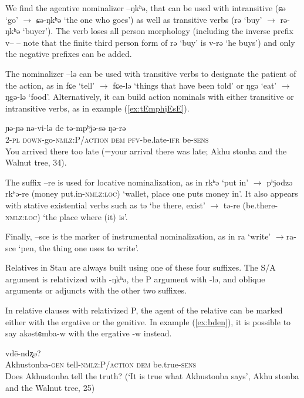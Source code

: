 \documentclass[oneside,a4paper,11pt]{article}
\newcommand{\ipa}[1]{{\phon #1}} %
\begin{document}
We find the agentive nominalizer \ipa{--ŋkʰə}, that can be used with intransitive (\ipa{ɕə}  `go' $\rightarrow$ \ipa{ɕə-ŋkʰə} `the one who goes') as well as transitive verbs (\ipa{rə} `buy' $\rightarrow$ \ipa{rə-ŋkʰə} `buyer'). The verb loses all person morphology (including the inverse prefix \ipa{v--} -- note that the finite third person form of \ipa{rə} `buy' is \ipa{v-rə} `he buys') and only the negative prefixes can be added.
 
The nominalizer \ipa{--lə} can be used with transitive verbs to designate the patient of the action, as in \ipa{fɕe} `tell' $\rightarrow$ \ipa{fɕe-lə} `things that have been told' or \ipa{ŋgə} `eat' $\rightarrow$ \ipa{ŋgə-lə} `food'. Alternatively, it can build action nominals with either transitive or intransitive verbs, as  in example (\ref{ex:tEmphjEsE}).

\begin{exe}
\ex \label{ex:tEmphjEsE} 
\gll
\ipa{ɲə-ɲə} 	\ipa{nə-vi-lə} 	\ipa{de} 	\ipa{tə-mpʰjə-sə} 	\ipa{ŋə-rə} \\
2-\textsc{pl} \textsc{down}-go-\textsc{nmlz:P/action} \textsc{dem} \textsc{pfv}-be.late-\textsc{ifr} be-\textsc{sens}\\
\glt You arrived there too late (=your arrival there was late; Akhu stonba and the Walnut tree, 34).
\end{exe}

The suffix \ipa{--re} is used for locative nominalization, as in \ipa{rkʰə} `put in' $\rightarrow$ \ipa{pʰjodzə} \ipa{rkʰə-re} (money put.in-\textsc{nmlz:loc}) `wallet, place one puts money in'. It also appears with stative existential verbs such as \ipa{tə} `be there, exist' $\rightarrow$ \ipa{tə-re} (be.there-\textsc{nmlz:loc}) `the place where (it) is'. 

Finally, \ipa{--sce} is the marker of instrumental nominalization, as in \ipa{ra} `write' $\rightarrow$\ipa{ra-sce} `pen, the thing one uses to write'.

Relatives in Stau are always built using one of these four suffixes. The S/A  argument is relativized with \ipa{-ŋkʰə}, the P argument with \ipa{-lə}, and oblique arguments or adjuncts with the other two suffixes. 

In relative clauses with relativized P, the agent of the relative can be marked either with the ergative or the genitive. In example (\ref{ex:bden}), it is possible to say  \ipa{akəstɞmba-w} with the ergative \ipa{-w} instead.

\begin{exe}
\ex \label{ex:bden}
\gll 
 [\ipa{akəstɞmba-j} 	\ipa{fɕe-lə}] 	\ipa{de} 	\ipa{vdẽ-ndʐə?} \\
 Akhustonba-\textsc{gen} tell-\textsc{nmlz:P/action} \textsc{dem} be.true-\textsc{sens} \\
\glt Does Akhustonba tell the truth?  (`It is true what Akhustonba says', Akhu stonba and the Walnut tree, 25)
\end{exe}
\end{document}

